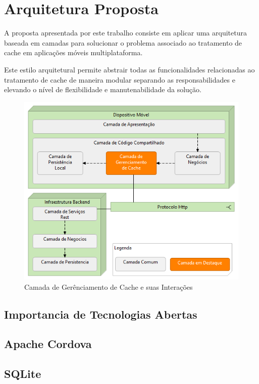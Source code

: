 \documentclass[
	article,			%
	11pt,				%
	oneside,			%
	a4paper,			%
	english,			%
	brazil,				%
	sumario=tradicional
]{abntex2}
\begin{document}
\section{Arquitetura Proposta}
A proposta apresentada por este trabalho consiste em aplicar uma arquitetura baseada em camadas para solucionar o problema associado ao tratamento de cache em aplicações móveis multiplataforma.

Este estilo arquitetural permite abstrair todas as funcionalidades relacionadas ao tratamento de cache de maneira modular separando as responsabilidades e elevando o nível de flexibilidade e manutenabilidade da solução.

\begin{figure}
	\centering
	\includegraphics[scale=0.7]{images/CamadasNivel0}
	\caption{Camada de Gerênciamento de Cache e suas Interações}
\end{figure}


\subsection{Importancia de Tecnologias Abertas}

\subsection{Apache Cordova}

\subsection{SQLite}
\end{document}
